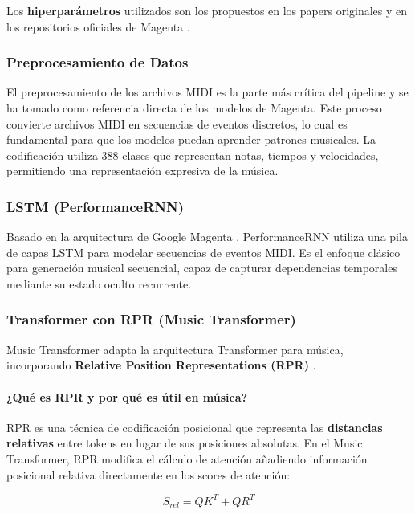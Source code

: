 \documentclass[12pt,a4paper]{article}
\begin{document}
Los \textbf{hiperparámetros} utilizados son los propuestos en los papers originales y en los repositorios oficiales de Magenta \cite{magenta_performance_rnn, magenta_music_transformer}.

\subsubsection{Preprocesamiento de Datos}

El preprocesamiento de los archivos MIDI es la parte más crítica del pipeline y se ha tomado como referencia directa de los modelos de Magenta. Este proceso convierte archivos MIDI en secuencias de eventos discretos, lo cual es fundamental para que los modelos puedan aprender patrones musicales. La codificación utiliza 388 clases que representan notas, tiempos y velocidades, permitiendo una representación expresiva de la música.

\subsubsection{LSTM (PerformanceRNN)}
Basado en la arquitectura de Google Magenta \cite{oore2018performance}, PerformanceRNN utiliza una pila de capas LSTM para modelar secuencias de eventos MIDI. Es el enfoque clásico para generación musical secuencial, capaz de capturar dependencias temporales mediante su estado oculto recurrente.

\subsubsection{Transformer con RPR (Music Transformer)}
Music Transformer \cite{huang2018music} adapta la arquitectura Transformer para música, incorporando \textbf{Relative Position Representations (RPR)} \cite{shaw2018selfattention}.

\paragraph{¿Qué es RPR y por qué es útil en música?}

RPR es una técnica de codificación posicional que representa las \textbf{distancias relativas} entre tokens en lugar de sus posiciones absolutas. En el Music Transformer, RPR modifica el cálculo de atención añadiendo información posicional relativa directamente en los scores de atención:

\begin{equation}
S_{rel} = QK^T + QR^T
\end{equation}
\end{document}
